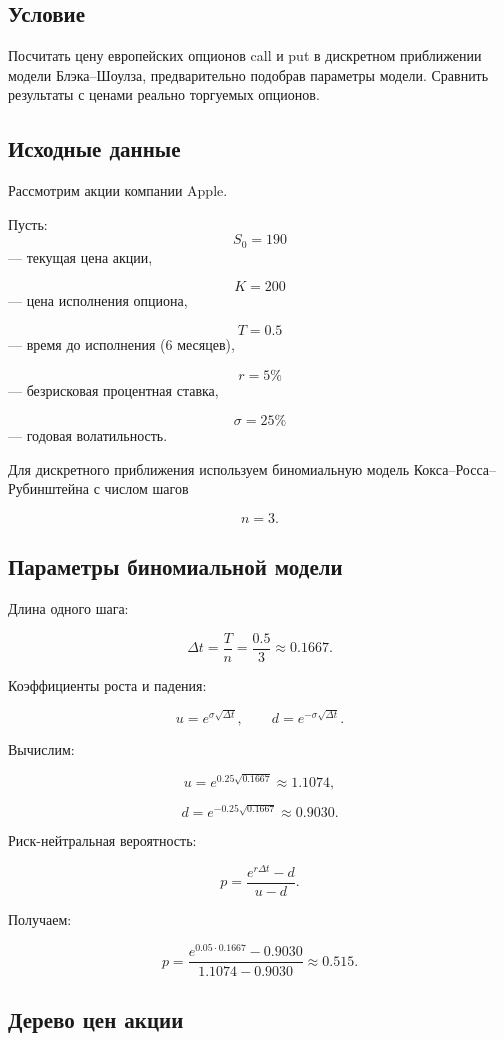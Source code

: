 \subsection*{Условие}

Посчитать цену европейских опционов call и put в дискретном приближении модели Блэка--Шоулза, предварительно подобрав параметры модели. Сравнить результаты с ценами реально торгуемых опционов.

\subsection*{Исходные данные}

Рассмотрим акции компании Apple.

Пусть:
\[
S_0 = 190
\]
--- текущая цена акции,

\[
K = 200
\]
--- цена исполнения опциона,

\[
T = 0.5
\]
--- время до исполнения (6 месяцев),

\[
r = 5\%
\]
--- безрисковая процентная ставка,

\[
\sigma = 25\%
\]
--- годовая волатильность.

Для дискретного приближения используем биномиальную модель Кокса--Росса--Рубинштейна с числом шагов

\[
n=3.
\]

\subsection*{Параметры биномиальной модели}

Длина одного шага:

\[
\Delta t=\frac{T}{n}=\frac{0.5}{3}\approx0.1667.
\]

Коэффициенты роста и падения:

\[
u=e^{\sigma\sqrt{\Delta t}},
\qquad
d=e^{-\sigma\sqrt{\Delta t}}.
\]

Вычислим:

\[
u=e^{0.25\sqrt{0.1667}}\approx1.1074,
\]

\[
d=e^{-0.25\sqrt{0.1667}}\approx0.9030.
\]

Риск-нейтральная вероятность:

\[
p=
\frac{e^{r\Delta t}-d}{u-d}.
\]

Получаем:

\[
p=
\frac{e^{0.05\cdot0.1667}-0.9030}{1.1074-0.9030}
\approx0.515.
\]

\subsection*{Дерево цен акции}

